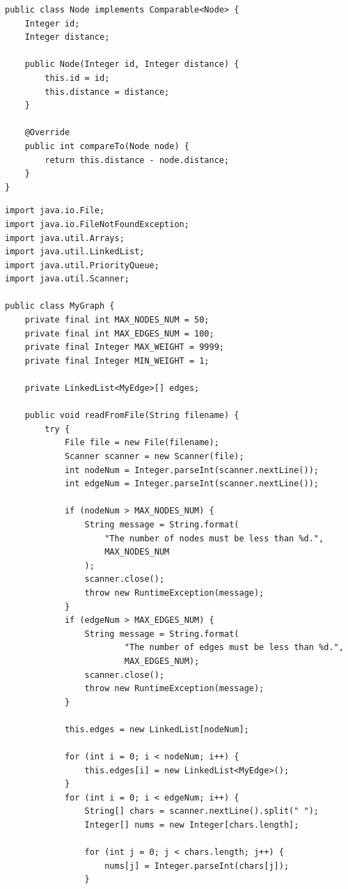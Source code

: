 \documentclass[a4j]{jarticle}
\begin{document}
\begin{lstlisting}[caption=Node.java]
public class Node implements Comparable<Node> {
    Integer id;
    Integer distance;

    public Node(Integer id, Integer distance) {
        this.id = id;
        this.distance = distance;
    }

    @Override
    public int compareTo(Node node) {
        return this.distance - node.distance;
    }
}
\end{lstlisting}

\begin{lstlisting}[caption=MyGraph.java]
import java.io.File;
import java.io.FileNotFoundException;
import java.util.Arrays;
import java.util.LinkedList;
import java.util.PriorityQueue;
import java.util.Scanner;

public class MyGraph {
    private final int MAX_NODES_NUM = 50;
    private final int MAX_EDGES_NUM = 100;
    private final Integer MAX_WEIGHT = 9999;
    private final Integer MIN_WEIGHT = 1;

    private LinkedList<MyEdge>[] edges;

    public void readFromFile(String filename) {
        try {
            File file = new File(filename);
            Scanner scanner = new Scanner(file);
            int nodeNum = Integer.parseInt(scanner.nextLine());
            int edgeNum = Integer.parseInt(scanner.nextLine());

            if (nodeNum > MAX_NODES_NUM) {
                String message = String.format(
                    "The number of nodes must be less than %d.",
                    MAX_NODES_NUM
                );
                scanner.close();
                throw new RuntimeException(message);
            }
            if (edgeNum > MAX_EDGES_NUM) {
                String message = String.format(
                        "The number of edges must be less than %d.",
                        MAX_EDGES_NUM);
                scanner.close();
                throw new RuntimeException(message);
            }

            this.edges = new LinkedList[nodeNum];

            for (int i = 0; i < nodeNum; i++) {
                this.edges[i] = new LinkedList<MyEdge>();
            }
            for (int i = 0; i < edgeNum; i++) {
                String[] chars = scanner.nextLine().split(" ");
                Integer[] nums = new Integer[chars.length];

                for (int j = 0; j < chars.length; j++) {
                    nums[j] = Integer.parseInt(chars[j]);
                }


\end{lstlisting}
\end{document}
